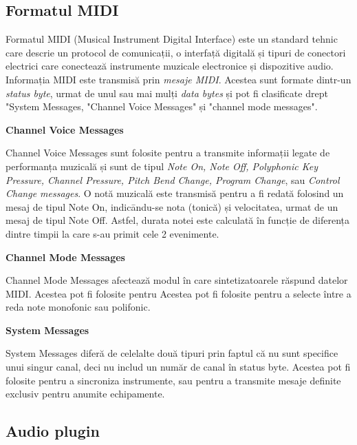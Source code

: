 \subsection{Formatul MIDI}
\noindent Formatul MIDI (Musical Instrument Digital Interface) este un standard tehnic care descrie un protocol de comunicații, o interfață digitală și tipuri de conectori electrici care conectează instrumente muzicale electronice și dispozitive audio. Informația MIDI este transmisă prin \textit{mesaje MIDI}. Acestea sunt formate dintr-un \textit{status byte}, urmat de unul sau mai mulți \textit{data bytes} și pot fi clasificate drept "System Messages, "Channel Voice Messages" și "channel mode messages". \cite{midi} \par
\noindent \textbf{Channel Voice Messages} \par 
\noindent Channel Voice Messages sunt folosite pentru a transmite informații legate de performanța muzicală și sunt de tipul \textit{Note On, Note Off, Polyphonic Key Pressure, Channel Pressure, Pitch Bend Change, Program Change}, sau \textit{Control Change messages}. O notă muzicală este transmisă pentru a fi redată folosind un mesaj de tipul Note On, indicāndu-se nota (tonică) și velocitatea, urmat de un mesaj de tipul Note Off. Astfel, durata notei este calculată în funcție de diferența dintre timpii la care s-au primit cele 2 evenimente. \par
\noindent \textbf{Channel Mode Messages} \par
\noindent Channel Mode Messages afectează modul în care sintetizatoarele răspund datelor MIDI. Acestea pot fi folosite pentru Acestea pot fi folosite pentru a selecte între a reda note monofonic sau polifonic.\par
\noindent \textbf{System Messages} \par
\noindent System Messages diferă de celelalte două tipuri prin faptul că nu sunt specifice unui singur canal, deci nu includ un număr de canal în status byte. Acestea pot fi folosite pentru a sincroniza instrumente, sau pentru a transmite mesaje definite exclusiv pentru anumite echipamente.
\noindent \par

\subsection{Audio plugin}

